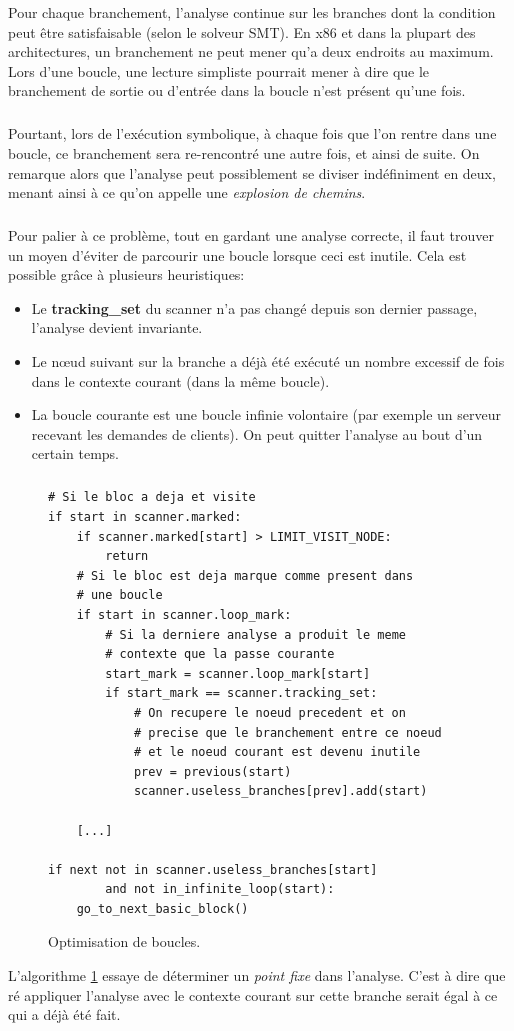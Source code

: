 Pour chaque branchement, l'analyse continue sur les branches dont la condition peut être satisfaisable (selon le solveur SMT). En x86 et dans la plupart des architectures,
un branchement ne peut mener qu'a deux endroits au maximum. Lors d'une boucle, une lecture simpliste pourrait mener à dire que le branchement de sortie ou d'entrée dans la boucle n'est présent qu'une fois.
\subparagraph{}
Pourtant, lors de l'exécution symbolique, à chaque fois que l'on rentre dans une boucle, ce branchement sera re-rencontré une autre fois, et ainsi de suite.
On remarque alors que l'analyse peut possiblement se diviser indéfiniment en deux, menant ainsi à ce qu'on appelle une \textit{explosion de chemins}.
\subparagraph{}
Pour palier à ce problème, tout en gardant une analyse correcte, il faut trouver un moyen d'éviter de parcourir une boucle lorsque ceci est inutile. Cela est possible grâce à plusieurs heuristiques:
\begin{itemize}
    \item Le \textbf{tracking\_set} du scanner n'a pas changé depuis son dernier passage, l'analyse devient invariante.
    \item Le nœud suivant sur la branche a déjà été exécuté un nombre excessif de fois dans le contexte courant (dans la même boucle).
    \item La boucle courante est une boucle infinie volontaire (par exemple un serveur recevant les demandes de clients). On peut quitter l'analyse au bout d'un certain temps.
\end{itemize}
\subparagraph{}
\begin{figure}[h!]
    \centering
    \begin {lstlisting}[frame=single]
# Si le bloc a deja et visite
if start in scanner.marked:
    if scanner.marked[start] > LIMIT_VISIT_NODE:
        return
    # Si le bloc est deja marque comme present dans
    # une boucle
    if start in scanner.loop_mark:
        # Si la derniere analyse a produit le meme
        # contexte que la passe courante
        start_mark = scanner.loop_mark[start]
        if start_mark == scanner.tracking_set:
            # On recupere le noeud precedent et on
            # precise que le branchement entre ce noeud
            # et le noeud courant est devenu inutile
            prev = previous(start)
            scanner.useless_branches[prev].add(start)

    [...]

if next not in scanner.useless_branches[start]
        and not in_infinite_loop(start):
    go_to_next_basic_block()
    \end{lstlisting}
    \caption{Optimisation de boucles.}
    \label{fig:fix-point}
\end{figure}
L'algorithme \ref{fig:fix-point} essaye de déterminer un \textit{point fixe} dans l'analyse. C'est à dire que ré appliquer l'analyse avec le contexte courant sur cette branche serait
égal à ce qui a déjà été fait.

